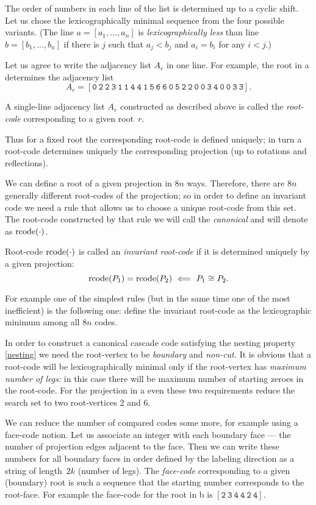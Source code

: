\documentclass[12pt]{article}
\begin{document}
The order of numbers in each line of the list is determined up to a cyclic shift. Let us chose
the lexicographically minimal sequence from the four possible variants. (The line
$a=[a_1,\dots,a_n]$ is {\it lexicographically less\/} than line $b=[b_1,\dots,b_n]$ if there is
$j$ such that $a_j<b_j$ and $a_i=b_i$ for any $i<j$.)

Let us agree to write the adjacency list $A_r$ in one line. For example, the root in
a determines the adjacency list
$$
A_r=[\mathtt{0~2~2~3~1~1~4~4~1~5~6~6~0~5~2~2~0~0~3~4~0~0~3~3}].
$$

\begin{dfn} A single-line adjacency list $A_r$ constructed as described above is called the {\it root-code\/}
cor\-re\-spon\-ding to a given root~$r$.\end{dfn}

Thus for a fixed root the corresponding root-code is defined uniquely; in turn a root-code
determines uniquely the corresponding projection (up to rotations and reflections).

We can define a root of a given projection in $8n$ ways. Therefore, there are $8n$ generally
different root-codes of the projection; so in order to define an invariant code we need a rule
that allows us to choose a unique root-code from this set. The root-code constructed by that rule
we will call the {\it canonical} and will denote as $\mathop{{\rm rcode}}(\cdot)$.

\begin{dfn} Root-code $\mathop{{\rm rcode}}(\cdot)$ is called an {\it invariant root-code\/} if it is
determined uniquely by a given projection:
$$
\mathop{{\rm rcode}}(P_1)=\mathop{{\rm rcode}}(P_2)\ \Longleftarrow\ P_1\cong P_2.
$$\end{dfn}

For example one of the simplest rules (but in the same time one of the most inefficient) is the
following one: define the invariant root-code as the lexicographic minimum among all $8n$ codes.

In order to construct a canonical cascade code satisfying the nesting property \eqref{nesting} we
need the root-vertex to be {\it boundary\/} and {\it non-cut.} It is obvious that a root-code
will be lexicographically minimal only if the root-vertex has {\it maximum number of legs:} in
this case there will be maximum number of starting zeroes in the root-code. For the projection in
a even these two requirements reduce the search set to two root-vertices 2
and 6.

We can reduce the number of compared codes some more, for example using a face-code notion. Let
us associate an integer with each boundary face --- the number of projection edges adjacent to
the face. Then we can write these numbers for all boundary faces in order defined by the labeling
direction as a string of length~$2k$ (number of legs). The {\it face-code\/} corresponding to a
given (boundary) root is such a sequence that the starting number corresponds to the root-face.
For example the face-code for the root in b is $[\mathtt{2~3~4~4~2~4}]$.
\end{document}
